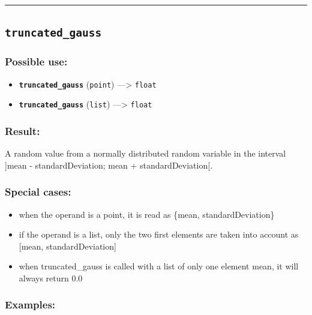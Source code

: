 \documentclass[]{book}
\providecommand{\tightlist}{%
  \setlength{\itemsep}{0pt}\setlength{\parskip}{0pt}}
\theoremstyle{definition}
\theoremstyle{definition}
\theoremstyle{definition}
\theoremstyle{remark}
\begin{document}
\begin{center}\rule{0.5\linewidth}{\linethickness}\end{center}

\subsection{\texorpdfstring{\texttt{truncated\_gauss}}{truncated\_gauss}}\label{truncated_gauss}

\subsubsection{Possible use:}\label{possible-use-535}

\begin{itemize}
\tightlist
\item
  \textbf{\texttt{truncated\_gauss}} (\texttt{point}) ---\textgreater{}
  \texttt{float}
\item
  \textbf{\texttt{truncated\_gauss}} (\texttt{list}) ---\textgreater{}
  \texttt{float}
\end{itemize}

\subsubsection{Result:}\label{result-517}

A random value from a normally distributed random variable in the
interval {]}mean - standardDeviation; mean + standardDeviation{[}.

\subsubsection{Special cases:}\label{special-cases-141}

\begin{itemize}
\tightlist
\item
  when the operand is a point, it is read as \{mean,
  standardDeviation\}\\
\item
  if the operand is a list, only the two first elements are taken into
  account as {[}mean, standardDeviation{]}\\
\item
  when truncated\_gauss is called with a list of only one element mean,
  it will always return 0.0
\end{itemize}

\subsubsection{Examples:}\label{examples-372}
\end{document}
